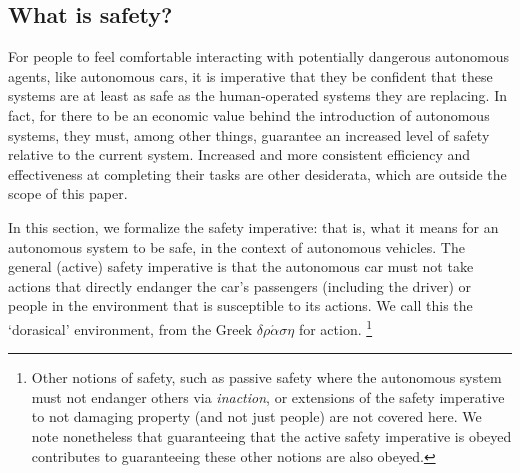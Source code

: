 \subsection{What is safety?}
\label{safety}

For people to feel comfortable interacting with potentially dangerous autonomous agents, like autonomous cars, it is imperative that they be confident that these systems are at least as safe as the human-operated systems they are replacing.
In fact, for there to be an economic value behind the introduction of autonomous systems, they must, among other things, guarantee an increased level of safety relative to the current system. 
Increased and more consistent efficiency and effectiveness at completing their tasks are other desiderata, which are outside the scope of this paper.

In this section, we formalize the safety imperative: 
that is, what it means for an autonomous system to be safe, in the context of autonomous vehicles.
The general (active) safety imperative is that the autonomous car must not take actions that directly endanger the car's passengers (including the driver) or people in the environment that is susceptible to its actions.
We call this the `dorasical' environment, from the Greek $\delta \rho \acute{\alpha} \sigma \eta$ for action.
\footnote{Other notions of safety, such as passive safety where the autonomous system must not endanger others via \emph{inaction}, or extensions of the safety imperative to not damaging property (and not just people) are not covered here. We note nonetheless that guaranteeing that the active safety imperative is obeyed contributes to guaranteeing these other notions are also obeyed.}

